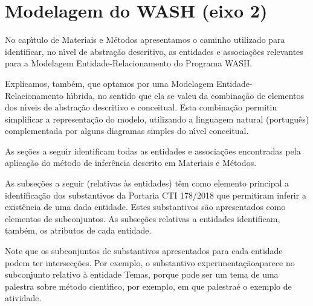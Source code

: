\documentclass[
12pt,		%
openright,	%
twoside,  %
a4paper,			%
chapter=TITLE,		%
english,			%
french,				%
spanish,			%
brazil				%
]{USPSC-classe/USPSC}
\begin{document}
\section[Modelagem do WASH (eixo 2)]{Modelagem do WASH (eixo 2)}\label{Modelagem do WASH (eixo 2)}
No cap\'{\i}tulo de Materiais e M\'etodos apresentamos o caminho utilizado para identificar, no n\'{\i}vel de abstra\c{c}\~ao descritivo, as entidades e associa\c{c}\~oes relevantes para a Modelagem Entidade-Relacionamento do Programa WASH.









Explicamos, tamb\'em, que optamos por uma Modelagem Entidade-Relacionamento h\'{\i}brida, no sentido que ela se valeu da combina\c{c}\~ao de elementos dos n\'{\i}veis de abstra\c{c}\~ao descritivo e conceitual. Esta combina\c{c}\~ao permitiu simplificar a representa\c{c}\~ao do modelo, utilizando a linguagem natural (portugu\^es) complementada por alguns diagramas simples do n\'{\i}vel conceitual.









As se\c{c}\~oes a seguir identificam todas as entidades e associa\c{c}\~oes encontradas pela aplica\c{c}\~ao do m\'etodo de infer\^encia descrito em Materiais e M\'etodos.









As subse\c{c}\~oes a seguir (relativas \`as entidades) t\^em como elemento principal a identifica\c{c}\~ao dos substantivos da Portaria CTI 178/2018 que permitiram inferir a exist\^encia de uma dada entidade. Estes substantivos s\~ao apresentados como elementos de subconjuntos. As subse\c{c}\~oes relativas a entidades identificam, tamb\'em, os atributos de cada entidade.









Note que os subconjuntos de substantivos apresentados para cada entidade podem ter intersec\c{c}\~oes. Por exemplo, o substantivo \textquotedbl experimenta\c{c}\~ao\textquotedbl  aparece no subconjunto relativo \`a entidade \textquotedbl Temas\textquotedbl , porque pode ser um tema de uma palestra sobre m\'etodo cient\'{\i}fico, por exemplo, em que \textquotedbl palestra\textquotedbl  \'e o exemplo de atividade.
\end{document}
